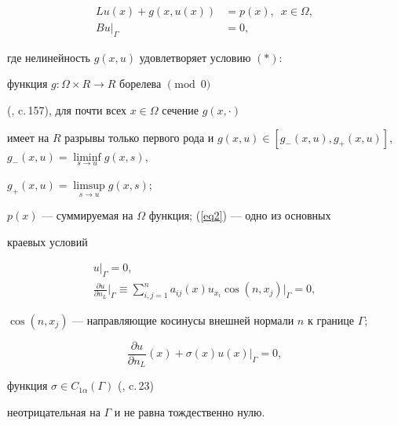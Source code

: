 \begin{align}


\label{eq1}


Lu(x)+g(x,u(x)) & = p(x),\ \; x \in \Omega, \\


Bu|_\Gamma & = 0, \label{eq2}


\end{align}


где нелинейность $g(x,u)$ удовлетворяет условию $(*)$: \label{*}





функция $g: \Omega \times R \to R$ борелева $\pmod{0}$ 


(\cite{n2}, c.\,157), для почти всех $x \in \Omega$ сечение $g(x,\cdot)$


имеет на $R$ разрывы только первого рода и $g(x,u) \in


[g_{-}(x,u),g_{+}(x,u)]$, $g_{-}(x,u)= \liminf\limits_{s \to u} g(x,s)$,


$g_{+}(x,u)=\limsup\limits_{s \to u} g(x,s)$;





$p(x)$ --- суммируемая на $\Omega$ функция; (\ref{eq2}) --- одно из основных


краевых условий


\begin{gather*}




u|_\Gamma=0, \\


\frac{\partial u}{\partial n_{L}}\bigg|_\Gamma \equiv


\sum\limits_{i,j=1}^n a_{i j}(x)u_{x_i} \cos(n,x_j)|_\Gamma =0,




\end{gather*}


$\cos(n,x_j)$ --- направляющие косинусы внешней нормали $n$ к границе $\Gamma$;


\begin{equation}


\label{eq5}


\frac{ \partial u}{ \partial n_{L}}(x)+ \sigma (x)u(x)|_\Gamma =0,


\end{equation}


функция $\sigma \in C_{1 \alpha}(\Gamma)$ (\cite{n1}, c.\,23)


неотрицательная на $\Gamma$ и не равна тождественно нулю.





